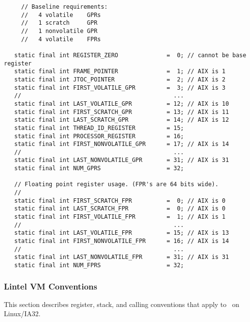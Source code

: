 \begin{verbatim}
     // Baseline requirements:
     //   4 volatile    GPRs
     //   1 scratch     GPR
     //   1 nonvolatile GPR
     //   4 volatile    FPRs

   static final int REGISTER_ZERO              =  0; // cannot be base register
   static final int FRAME_POINTER              =  1; // AIX is 1
   static final int JTOC_POINTER               =  2; // AIX is 2
   static final int FIRST_VOLATILE_GPR         =  3; // AIX is 3
   //                                            ...
   static final int LAST_VOLATILE_GPR          = 12; // AIX is 10
   static final int FIRST_SCRATCH_GPR          = 13; // AIX is 11
   static final int LAST_SCRATCH_GPR           = 14; // AIX is 12
   static final int THREAD_ID_REGISTER         = 15;
   static final int PROCESSOR_REGISTER         = 16;
   static final int FIRST_NONVOLATILE_GPR      = 17; // AIX is 14
   //                                            ...
   static final int LAST_NONVOLATILE_GPR       = 31; // AIX is 31
   static final int NUM_GPRS                   = 32;

   // Floating point register usage. (FPR's are 64 bits wide).
   //
   static final int FIRST_SCRATCH_FPR          =  0; // AIX is 0
   static final int LAST_SCRATCH_FPR           =  0; // AIX is 0
   static final int FIRST_VOLATILE_FPR         =  1; // AIX is 1
   //                                            ...
   static final int LAST_VOLATILE_FPR          = 15; // AIX is 13
   static final int FIRST_NONVOLATILE_FPR      = 16; // AIX is 14
   //                                            ...
   static final int LAST_NONVOLATILE_FPR       = 31; // AIX is 31
   static final int NUM_FPRS                   = 32;
\end{verbatim}



\subsubsection{Lintel VM Conventions} \label{lintel-conventions}

This section describes register, stack, and calling conventions that apply to 
\jp\ on Linux/IA32.


